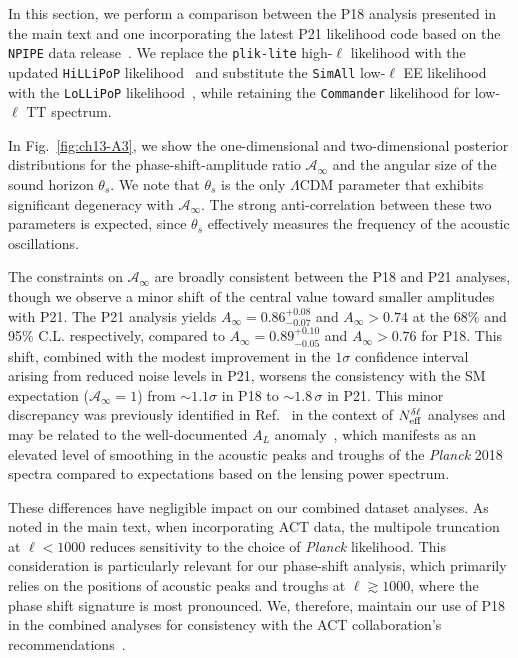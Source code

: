 \begin{subappendices}
\noindent In this section, we perform a comparison between the P18 analysis presented in the main text and one incorporating the latest P21 likelihood code based on the \texttt{NPIPE} data release~\cite{Planck:2020olo}. We replace the \texttt{plik-lite} high-$\ell$ likelihood with the updated \texttt{HiLLiPoP} likelihood~\cite{Tristram:2020wbi,Tristram:2023haj} and substitute the \texttt{SimAll} low-$\ell$ EE likelihood with the \texttt{LoLLiPoP} likelihood~\cite{Tristram:2020wbi,Tristram:2023haj}, while retaining the \texttt{Commander} likelihood for low-$\ell$ TT spectrum.


In Fig.~\ref{fig:ch13-A3}, we show the one-dimensional and two-dimensional posterior distributions for the phase-shift-amplitude ratio $\mathcal{A}_\infty$
and the angular size of the sound horizon $\theta_s$. We note that $\theta_s$ is the only $\Lambda$CDM parameter that exhibits significant degeneracy with $\mathcal{A}_\infty$. The strong anti-correlation between these two parameters is expected, since $\theta_s$ effectively measures the frequency of the acoustic oscillations.

The constraints on $\mathcal{A}_\infty$ are broadly consistent between the P18 and P21 analyses, though we observe a minor shift of the central value toward smaller amplitudes with P21. The P21 analysis yields $A_\infty=0.86_{-0.07}^{+0.08}$ and $A_\infty>0.74$ at the 68\%  and 95\% C.L. respectively, compared to $A_\infty=0.89_{-0.05}^{+0.10}$ and $A_\infty>0.76$ for P18. This shift, combined with the modest improvement in the $1\sigma$ confidence interval arising from reduced noise levels in P21, worsens the consistency with the SM expectation ($\mathcal{A}_\infty = 1$) from $\sim1.1\sigma$ in P18 to $\sim 1.8\,\sigma$ in P21. This minor discrepancy was previously identified in Ref.~\cite{Montefalcone:2025unv} in the context of $N_{\rm eff}^{\delta\ell}$ analyses and may be related to the well-documented $A_L$ anomaly~\cite{Planck:2018vyg}, which manifests as an elevated level of smoothing in the acoustic peaks and troughs of the {\it Planck} 2018 spectra compared to expectations based on the lensing power spectrum.

These differences have negligible impact on our combined dataset analyses. As noted in the main text, when incorporating ACT data, the multipole truncation at $\ell< 1000$ reduces sensitivity to the choice of {\it Planck} likelihood. This consideration is particularly relevant for our phase-shift analysis, which primarily relies on the positions of acoustic peaks and troughs at $\ell\gtrsim 1000$, where the phase shift signature is most pronounced. We, therefore, maintain our use of P18 in the combined analyses for consistency with the ACT collaboration's recommendations~\cite{ACT:2025fju}.



\end{subappendices}
